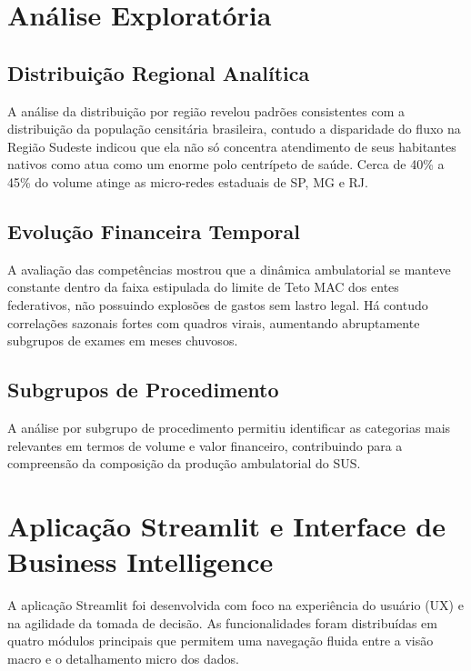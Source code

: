 \documentclass[
    12pt,
    oneside,
    a4paper,
    chapter=TITLE,
    section=TITLE
]{abntex2}
\begin{document}
\section{Análise Exploratória}

\subsection{Distribuição Regional Analítica}

A análise da distribuição por região revelou padrões consistentes com a distribuição da população censitária brasileira, contudo a disparidade do fluxo na Região Sudeste indicou que ela não só concentra atendimento de seus habitantes nativos como atua como um enorme polo centrípeto de saúde. Cerca de 40\% a 45\% do volume atinge as micro-redes estaduais de SP, MG e RJ.

\subsection{Evolução Financeira Temporal}

A avaliação das competências mostrou que a dinâmica ambulatorial se manteve constante dentro da faixa estipulada do limite de Teto MAC dos entes federativos, não possuindo explosões de gastos sem lastro legal. Há contudo correlações sazonais fortes com quadros virais, aumentando abruptamente subgrupos de exames em meses chuvosos.

\subsection{Subgrupos de Procedimento}

A análise por subgrupo de procedimento permitiu identificar as categorias mais relevantes em termos de volume e valor financeiro, contribuindo para a compreensão da composição da produção ambulatorial do SUS.

\section{Aplicação Streamlit e Interface de Business Intelligence}

A aplicação Streamlit foi desenvolvida com foco na experiência do usuário (UX) e na agilidade da tomada de decisão. As funcionalidades foram distribuídas em quatro módulos principais que permitem uma navegação fluida entre a visão macro e o detalhamento micro dos dados.
\end{document}
